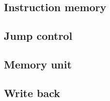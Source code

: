 \subsection{Instruction memory}
\subsection{Jump control}
\subsection{Memory unit}
\subsection{Write back}
